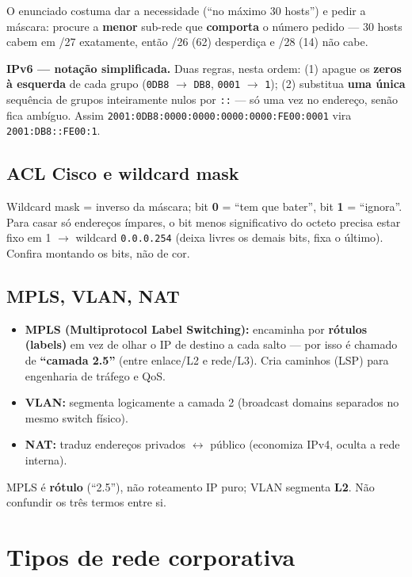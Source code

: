 O enunciado costuma dar a necessidade (``no máximo 30 hosts'') e pedir a
máscara: procure a \textbf{menor} sub-rede que \textbf{comporta} o número
pedido --- 30 hosts cabem em /27 exatamente, então /26 (62) desperdiça e /28
(14) não cabe.

\textbf{IPv6 --- notação simplificada.} Duas regras, nesta ordem: (1) apague
os \textbf{zeros à esquerda} de cada grupo (\texttt{0DB8} $\to$
\texttt{DB8}, \texttt{0001} $\to$ \texttt{1}); (2) substitua \textbf{uma
única} sequência de grupos inteiramente nulos por \texttt{::} --- só uma vez
no endereço, senão fica ambíguo. Assim
\texttt{2001:0DB8:0000:0000:0000:0000:FE00:0001} vira
\texttt{2001:DB8::FE00:1}.

\subsection{ACL Cisco e wildcard mask}

Wildcard mask = inverso da máscara; bit \textbf{0} = ``tem que bater'', bit
\textbf{1} = ``ignora''. Para casar só endereços ímpares, o bit menos
significativo do octeto precisa estar fixo em 1 $\to$ wildcard
\texttt{0.0.0.254} (deixa livres os demais bits, fixa o último). Confira
montando os bits, não de cor.

\subsection{MPLS, VLAN, NAT}

\begin{itemize}
\item \textbf{MPLS (Multiprotocol Label Switching):} encaminha por
\textbf{rótulos (labels)} em vez de olhar o IP de destino a cada salto ---
por isso é chamado de \textbf{``camada 2.5''} (entre enlace/L2 e rede/L3).
Cria caminhos (LSP) para engenharia de tráfego e QoS.
\item \textbf{VLAN:} segmenta logicamente a camada 2 (broadcast domains
separados no mesmo switch físico).
\item \textbf{NAT:} traduz endereços privados $\leftrightarrow$ público
(economiza IPv4, oculta a rede interna).
\end{itemize}

\begin{pegadinha}
MPLS é \textbf{rótulo} (``2.5''), não roteamento IP puro; VLAN segmenta
\textbf{L2}. Não confundir os três termos entre si.
\end{pegadinha}

\section{Tipos de rede corporativa}

